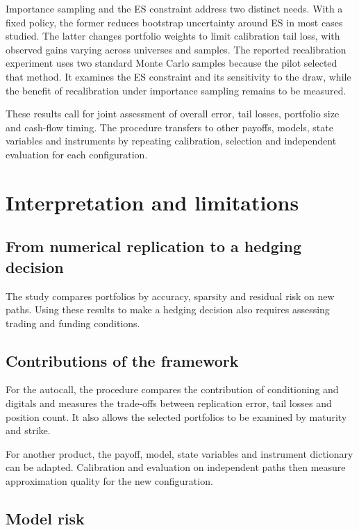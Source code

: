 \documentclass[12pt,a4paper]{article}
\newcommand{\1}{\mathbf{1}}
\begin{document}
Importance sampling and the ES constraint address two distinct needs. With a fixed policy, the former reduces bootstrap uncertainty around ES in most cases studied. The latter changes portfolio weights to limit calibration tail loss, with observed gains varying across universes and samples. The reported recalibration experiment uses two standard Monte Carlo samples because the pilot selected that method. It examines the ES constraint and its sensitivity to the draw, while the benefit of recalibration under importance sampling remains to be measured.

These results call for joint assessment of overall error, tail losses, portfolio size and cash-flow timing. The procedure transfers to other payoffs, models, state variables and instruments by repeating calibration, selection and independent evaluation for each configuration.

\section{Interpretation and limitations}

\subsection{From numerical replication to a hedging decision}

The study compares portfolios by accuracy, sparsity and residual risk on new paths. Using these results to make a hedging decision also requires assessing trading and funding conditions.

\subsection{Contributions of the framework}

For the autocall, the procedure compares the contribution of conditioning and digitals and measures the trade-offs between replication error, tail losses and position count. It also allows the selected portfolios to be examined by maturity and strike.

For another product, the payoff, model, state variables and instrument dictionary can be adapted. Calibration and evaluation on independent paths then measure approximation quality for the new configuration.

\subsection{Model risk}
\end{document}
